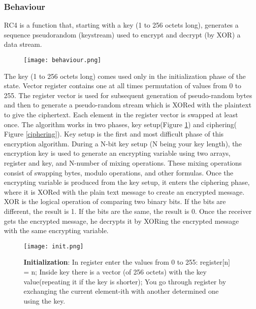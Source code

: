 \documentclass{article}
\begin{document}
\subsubsection{Behaviour}
RC4 is a function that, starting with a key (1 to 256 octets long), generates a sequence pseudorandom (keystream) used to encrypt and decrypt (by XOR) a data stream.
\begin{figure}[htb]
	\begin{center}
  		\texttt{[image: behaviour.png]} 
 	\end{center}
\end{figure}
The key (1 to 256 octets long) comes used only in the initialization phase of the state. Vector register contains one at all times permutation of values from 0 to 255. The register vector is used for subsequent generation of pseudo-random bytes and then to generate a pseudo-random stream which is XORed with the plaintext to give the ciphertext. Each element in the register vector is swapped at least once. The algorithm works in two phases, key setup(Figure \ref{init}) and ciphering( Figure \ref{ciphering}). Key setup is the first and most difficult phase of this encryption algorithm. During a N-bit key setup (N being your key length), the encryption key is used to generate an encrypting variable using two arrays, register and key, and N-number of mixing operations. These mixing operations consist of swapping bytes, modulo operations, and other formulas. Once the encrypting variable is produced from the key setup, it enters the ciphering phase, where it is XORed with the plain text message to create an encrypted message. XOR is the logical operation of comparing two binary bits. If the bits are different, the result is 1. If the bits are the same, the result is 0. Once the receiver gets the encrypted message, he decrypts it by XORing the encrypted message with the same encrypting variable. 
\begin{figure}[htb]
	\begin{center}
  		\texttt{[image: init.png]}
 	\end{center}
 	\caption{\textbf{Initialization}: In register enter the values from 0 to 255: register[n] = n; Inside key there is a vector (of 256 octets) with the key value(repeating it if the key is  shorter); You go through register by exchanging the current element-ith with another determined one using the key.}
 	\label{init}
\end{figure}
\end{document}
